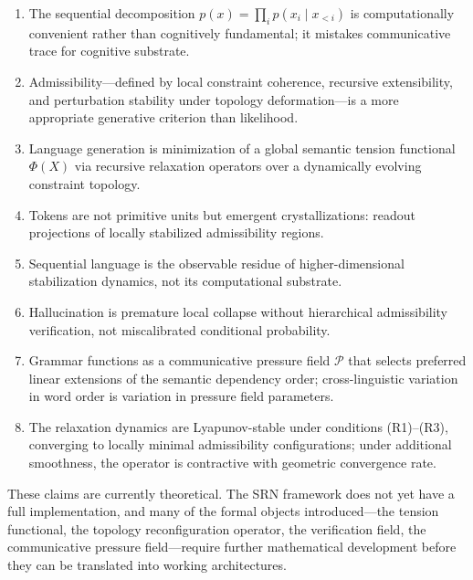 \documentclass[11pt, a4paper]{article}
\theoremstyle{srn}
\theoremstyle{srnremark}
\newcommand{\Phiten}{\varPhi}            %
\begin{document}
\begin{enumerate}
  \item The sequential decomposition $p(x) = \prod_i p(x_i \mid
    x_{<i})$ is computationally convenient rather than cognitively
    fundamental; it mistakes communicative trace for cognitive
    substrate.

  \item Admissibility---defined by local constraint coherence,
    recursive extensibility, and perturbation stability under
    topology deformation---is a more appropriate generative criterion
    than likelihood.

  \item Language generation is minimization of a global semantic
    tension functional $\Phiten(X)$ via recursive relaxation operators
    over a dynamically evolving constraint topology.

  \item Tokens are not primitive units but emergent crystallizations:
    readout projections of locally stabilized admissibility regions.

  \item Sequential language is the observable residue of
    higher-dimensional stabilization dynamics, not its computational
    substrate.

  \item Hallucination is premature local collapse without hierarchical
    admissibility verification, not miscalibrated conditional
    probability.

  \item Grammar functions as a communicative pressure field $\mathcal{P}$
    that selects preferred linear extensions of the semantic dependency
    order; cross-linguistic variation in word order is variation in
    pressure field parameters.

  \item The relaxation dynamics are Lyapunov-stable under conditions
    (R1)--(R3), converging to locally minimal admissibility
    configurations; under additional smoothness, the operator is
    contractive with geometric convergence rate.
\end{enumerate}

These claims are currently theoretical.
The SRN framework does not yet have a full implementation, and many
of the formal objects introduced---the tension functional, the
topology reconfiguration operator, the verification field, the
communicative pressure field---require further mathematical
development before they can be translated into working architectures.
\end{document}
